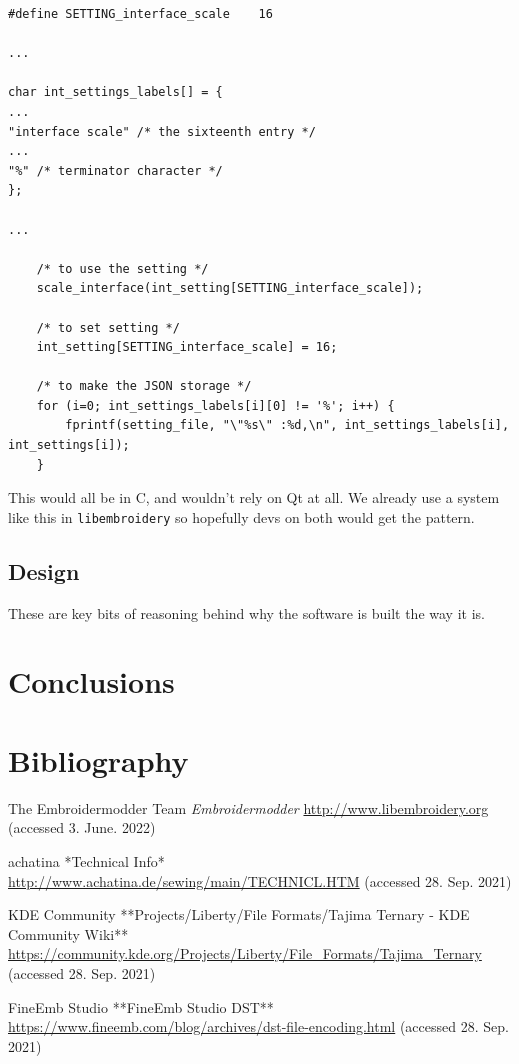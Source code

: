 \documentclass[11pt]{report}
\begin{document}
\begin{lstlisting}
#define SETTING_interface_scale    16

...

char int_settings_labels[] = {
...
"interface scale" /* the sixteenth entry */
...
"%" /* terminator character */
};

...

    /* to use the setting */
    scale_interface(int_setting[SETTING_interface_scale]);

    /* to set setting */
    int_setting[SETTING_interface_scale] = 16;

    /* to make the JSON storage */
    for (i=0; int_settings_labels[i][0] != '%'; i++) {
        fprintf(setting_file, "\"%s\" :%d,\n", int_settings_labels[i], int_settings[i]);
    }
\end{lstlisting}

This would all be in C, and wouldn't rely on Qt at all. We already use a
system like this in \texttt{libembroidery} so hopefully devs on both
would get the pattern.

\subsection{Design}

These are key bits of reasoning behind why the software is built the way
it is.

\section{Conclusions}


\section{Bibliography}

The Embroidermodder Team \emph{Embroidermodder}
\url{http://www.libembroidery.org} (accessed 3. June. 2022)

achatina *Technical Info*
\url{http://www.achatina.de/sewing/main/TECHNICL.HTM} (accessed 28. Sep. 2021)

KDE Community
**Projects/Liberty/File Formats/Tajima Ternary - KDE Community Wiki**
\url{https://community.kde.org/Projects/Liberty/File_Formats/Tajima_Ternary}
(accessed 28. Sep. 2021)

FineEmb Studio
**FineEmb Studio \guillemotright DST**
\url{https://www.fineemb.com/blog/archives/dst-file-encoding.html}
(accessed 28. Sep. 2021)
\end{document}
